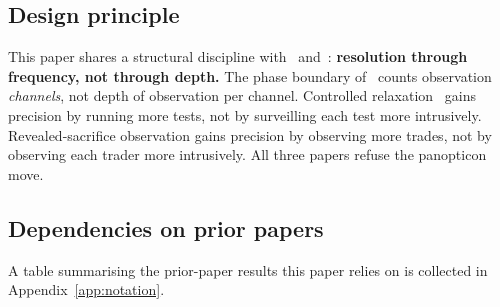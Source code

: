 \subsection{Design principle}
\label{sec:design_principle}

This paper shares a structural discipline
with~\citep{lasser2026phase} and~\citep{lasser2026wamura}:
\textbf{resolution through frequency, not through depth.}
The phase boundary
of~\citep[Theorem~2]{lasser2026phase} counts observation
\emph{channels}, not depth of observation per channel.  Controlled
relaxation~\citep{lasser2026wamura} gains precision by running more
tests, not by surveilling each test more intrusively.
Revealed-sacrifice observation gains precision by observing more
trades, not by observing each trader more intrusively.  All three
papers refuse the panopticon move.

\subsection{Dependencies on prior papers}
\label{sec:dependencies}

A table summarising the prior-paper results this paper relies on
is collected in Appendix~\ref{app:notation}.
